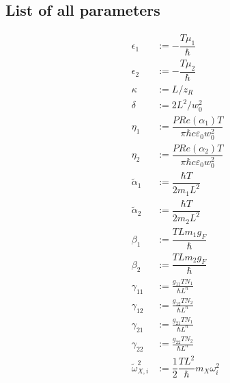 \documentclass[12pt]{article}
\begin{document}
\subsection{List of all parameters} \label{Parameterlist}
 \begin{align}
 \epsilon_1 &:= -\dfrac{T \mu_1}{\hbar} \\
 \epsilon_2 &:= -\dfrac{T \mu_2}{\hbar} \\
 \kappa &:= L / z_R \\
 \delta &:= 2 L^2 / w_0^2 \\
 \eta_1 &:= \dfrac{P Re(\alpha_1) T}{\pi\hbar c \varepsilon_0 w_0^2}\\
 \eta_2 &:= \dfrac{P Re(\alpha_2) T}{\pi\hbar c \varepsilon_0 w_0^2}\\
 \tilde{\alpha}_1 &:=\dfrac{\hbar T}{2 m_1 L^2}\\
 \tilde{\alpha}_2 &:=\dfrac{\hbar T}{2 m_2 L^2}\\
 \beta_1 &:= \dfrac{T L m_1 g_F }{\hbar} \\
 \beta_2 &:=  \dfrac{T L m_2 g_F }{\hbar} \\
 \gamma_{11} &:= \frac{g_{11} T N_1}{\hbar L^n}\\
 \gamma_{12} &:= \frac{g_{12} T N_2}{\hbar L^n}\\
 \gamma_{21} &:= \frac{g_{21} T N_1}{\hbar L^n} \\
 \gamma_{22} &:= \frac{g_{22} T N_2}{\hbar L^n}\\
 \tilde{\omega}^2_{X,i}&:=\dfrac{1}{2}\dfrac{TL^2}{\hbar} m_X \omega^2_i
 \end{align}
\end{document}
